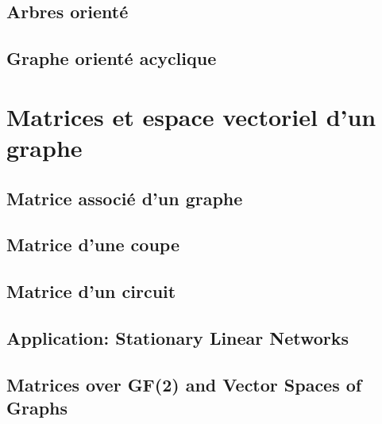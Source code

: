 \subsection{Arbres orienté}

\subsection{Graphe orienté acyclique}

\section{Matrices et espace vectoriel d'un graphe}
\subsection{Matrice associé d'un graphe}
\subsection{Matrice d'une coupe}
\subsection{Matrice  d'un circuit}
\subsection{Application: Stationary Linear Networks}
\subsection{Matrices over GF(2) and Vector Spaces of Graphs}


